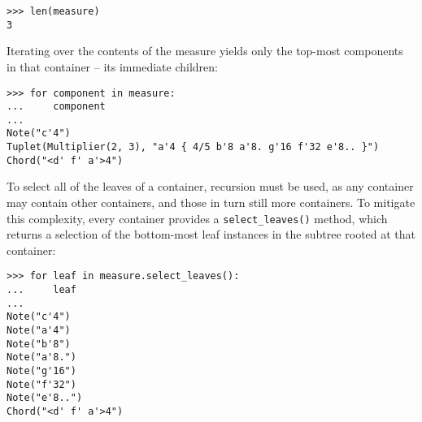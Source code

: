 \begin{comment}
<abjad>
len(measure)
</abjad>
\end{comment}

\begin{abjadbookoutput}
\begin{singlespacing}
\vspace{-0.5\baselineskip}
\begin{lstlisting}
>>> len(measure)
3
\end{lstlisting}
\end{singlespacing}
\end{abjadbookoutput}

\noindent Iterating over the contents of the  measure yields only
the top-most components in that container -- its immediate children:

\begin{comment}
<abjad>
for component in measure:
    component

</abjad>
\end{comment}

\begin{abjadbookoutput}
\begin{singlespacing}
\vspace{-0.5\baselineskip}
\begin{lstlisting}
>>> for component in measure:
...     component
...
Note("c'4")
Tuplet(Multiplier(2, 3), "a'4 { 4/5 b'8 a'8. g'16 f'32 e'8.. }")
Chord("<d' f' a'>4")
\end{lstlisting}
\end{singlespacing}
\end{abjadbookoutput}

\noindent To select all of the leaves of a container, recursion must be used,
as any container may contain other containers, and those in turn still more
containers. To mitigate this complexity, every container provides a
\texttt{select\_leaves()} method, which returns a selection of the bottom-most
leaf instances in the subtree rooted at that container:

\begin{comment}
<abjad>
for leaf in measure.select_leaves():
    leaf

</abjad>
\end{comment}

\begin{abjadbookoutput}
\begin{singlespacing}
\vspace{-0.5\baselineskip}
\begin{lstlisting}
>>> for leaf in measure.select_leaves():
...     leaf
...
Note("c'4")
Note("a'4")
Note("b'8")
Note("a'8.")
Note("g'16")
Note("f'32")
Note("e'8..")
Chord("<d' f' a'>4")
\end{lstlisting}
\end{singlespacing}
\end{abjadbookoutput}


